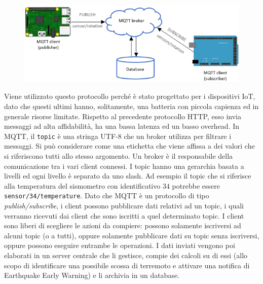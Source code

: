 \documentclass[a4paper,10pt]{memoir}
\begin{document}
\begin{figure}[ht]
\centering
\label{fig:mqtt}
\includegraphics[width=1\textwidth]{Chapter-1/mqtt.jpg}
\end{figure}
Viene utilizzato questo protocollo perché è stato progettato per i dispositivi IoT, dato che questi ultimi hanno, solitamente, una batteria con piccola capienza ed in generale risorse limitate. Rispetto al precedente protocollo HTTP, esso invia messaggi ad alta affidabilità, ha una bassa latenza ed un basso overhead\cite{ottimizzazione}. In MQTT, il \texttt{topic} è una stringa UTF-8 che un broker utilizza per filtrare i messaggi. 
Si può considerare come una etichetta che viene affissa a dei valori che si riferiscono tutti allo stesso argomento. Un broker è il responsabile della comunicazione tra i vari client connessi. I topic hanno una gerarchia basata a livelli ed ogni livello è separato da uno slash. 
Ad esempio il topic che si riferisce alla temperatura del sismometro con identificativo $34$ potrebbe essere \texttt{sensor/34/temperature}.
Dato che MQTT è un protocollo di tipo \textit{publish/subscribe}, i client possono pubblicare dati relativi ad un topic, i quali verranno ricevuti dai client che sono iscritti a quel determinato topic.
I client sono liberi di scegliere le azioni da compiere: possono solamente iscriversi ad alcuni topic (o a tutti), oppure solamente pubblicare dati su topic senza iscriversi, oppure possono eseguire entrambe le operazioni.
I dati inviati vengono poi elaborati in un server centrale che li gestisce, compie dei calcoli su di essi (allo scopo di identificare una possibile scossa di terremoto e attivare una notifica di Earthquake Early Warning) e li archivia in un database. 

\clearpage
\end{document}
